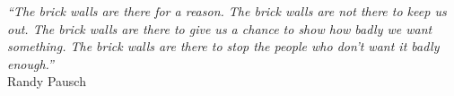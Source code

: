 \cleardoublepage
\thispagestyle{plain}

\vspace*{8cm}

\begin{flushright}
   \textsl{``The brick walls are there for a reason.
   The brick walls are not there to keep us out.
   The brick walls are there to give us a chance to show how badly we want something.
   The brick walls are there to stop the people who don’t want it badly enough.''} \\
\vspace*{1.5cm}
           Randy Pausch
\end{flushright}
